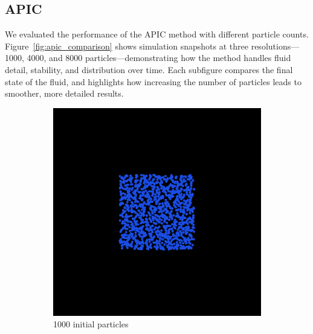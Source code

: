 \subsection{APIC}

We evaluated the performance of the APIC method with different particle counts. Figure~\ref{fig:apic_comparison} shows simulation snapshots at three resolutions—1000, 4000, and 8000 particles—demonstrating how the method handles fluid detail, stability, and distribution over time. Each subfigure compares the final state of the fluid, and highlights how increasing the number of particles leads to smoother, more detailed results.

\begin{figure}[h]
    \centering
    \begin{subfigure}[b]{0.2\textwidth}
        \includegraphics[width=\textwidth]{figures/apic1000_init.png}
        \caption{1000 initial particles}
    \end{subfigure}
    \begin{subfigure}[b]{0.2\textwidth}

\end{subfigure}
\end{figure}
